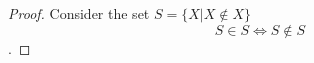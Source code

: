 \begin{questions}

\begin{solution}
  \begin{proof}
  Consider the set $S = \{ X | X \notin X \}$
  $$S \in S \iff S \notin S$$.
  \end{proof}
\end{solution}
\end{questions}